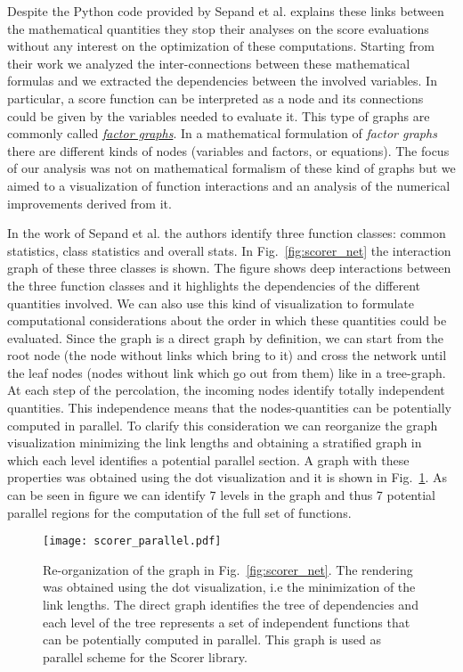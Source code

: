 \documentclass{standalone}
\begin{document}
Despite the \textsf{Python} code provided by Sepand et al. explains these links between the mathematical quantities they stop their analyses on the score evaluations without any interest on the optimization of these computations.
Starting from their work we analyzed the inter-connections between these mathematical formulas and we extracted the dependencies between the involved variables.
In particular, a score function can be interpreted as a node and its connections could be given by the variables needed to evaluate it.
This type of graphs are commonly called \href{https://en.wikipedia.org/wiki/Factor_graph}{\emph{factor graphs}}.
In a mathematical formulation of \emph{factor graphs} there are different kinds of nodes (variables and factors, or equations).
The focus of our analysis was not on mathematical formalism of these kind of graphs but we aimed to a visualization of function interactions and an analysis of the numerical improvements derived from it.

In the work of Sepand et al. the authors identify three function classes: common statistics, class statistics and overall stats.
In Fig.~\ref{fig:scorer_net} the interaction graph of these three classes is shown.
The figure shows deep interactions between the three function classes and it highlights the dependencies of the different quantities involved.
We can also use this kind of visualization to formulate computational considerations about the order in which these quantities could be evaluated.
Since the graph is a direct graph by definition, we can start from the root node (the node without links which bring to it) and cross the network until the leaf nodes (nodes without link which go out from them) like in a tree-graph.
At each step of the percolation, the incoming nodes identify totally independent quantities.
This independence means that the nodes-quantities can be potentially computed in parallel.
To clarify this consideration we can reorganize the graph visualization minimizing the link lengths and obtaining a stratified graph in which each level identifies a potential parallel section.
A graph with these properties was obtained using the \textsf{dot} visualization and it is shown in Fig.~\ref{fig:scorer_parallel}.
As can be seen in figure we can identify 7 levels in the graph and thus 7 potential parallel regions for the computation of the full set of functions.

\begin{center}
\begin{figure}[htbp]
\hspace{-2cm}
\texttt{[image: scorer\_parallel.pdf]}
\caption{Re-organization of the graph in Fig.~\ref{fig:scorer_net}.
The rendering was obtained using the \textsf{dot} visualization, i.e the minimization of the link lengths.
The direct graph identifies the tree of dependencies and each level of the tree represents a set of independent functions that can be potentially computed in parallel.
This graph is used as parallel scheme for the \textsf{Scorer} library.
}
\label{fig:scorer_parallel}
\end{figure}
\end{center}
\end{document}
